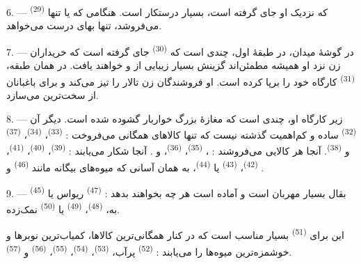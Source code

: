 \VUsaut{4.0mm}
\VUsaut{3.0mm}

6. ---  \textsuperscript{(29)} که نزدیک او جای گرفته
است، بسیار درستکار است. هنگامی که  یا تنها
 می‌فروشد، تنها بهای درست می‌خواهد.

7. --- در گوشهٔ میدان، در طبقهٔ اول، چندی است که 
\textsuperscript{(30)} جای گرفته است که خریداران زن نزد او همیشه مطمئن‌اند
گزینش بسیار زیبایی از  و
 خواهند یافت. در همان طبقه، 
\textsuperscript{(31)} کارگاه خود را برپا کرده است. او 
فروشندگان زن تالار را تیز می‌کند و برای باغبانان  از
سخت‌ترین  می‌سازد.

\VUsaut{4.0mm}
\VUsaut{3.0mm}

8. --- زیر کارگاه او، چندی است که مغازهٔ بزرگ خواربار گشوده شده است.
دیگر آن  \textsuperscript{(32)} ساده و کم‌اهمیت گذشته
نیست که تنها کالاهای همگانی می‌فروخت : 
\textsuperscript{(33)}،  \textsuperscript{(34)}،
 \textsuperscript{(37)} و 
\textsuperscript{(38)}. آنجا هر کالایی می‌فروشند : ،  \textsuperscript{(35)}، 
\textsuperscript{(36)}،  و
. آنجا شکار می‌یابند : 
\textsuperscript{(39)}،  \textsuperscript{(40)}،
 \textsuperscript{(41)}، 
\textsuperscript{(42)}،  \textsuperscript{(43)} یا
 \textsuperscript{(44)}، به همان آسانی که میوه‌های
بیگانه مانند  \textsuperscript{(46)} و
.

9. ---  \textsuperscript{(45)} بقال بسیار مهربان است و
آماده است هر چه بخواهند بدهد :  \textsuperscript{(47)}
ریواس یا به،  \textsuperscript{(48)}، 
\textsuperscript{(49)} یا  \textsuperscript{(50)} نمک‌زده.

این برای  \textsuperscript{(51)} بسیار مناسب است که
در کنار همگانی‌ترین کالاها، کمیاب‌ترین نوبرها و خوشمزه‌ترین میوه‌ها را
می‌یابند :  \textsuperscript{(52)} پرآب،
 \textsuperscript{(53)}، 
\textsuperscript{(54)}،  \textsuperscript{(55)}،
 \textsuperscript{(56)} و 
\textsuperscript{(57)}.

